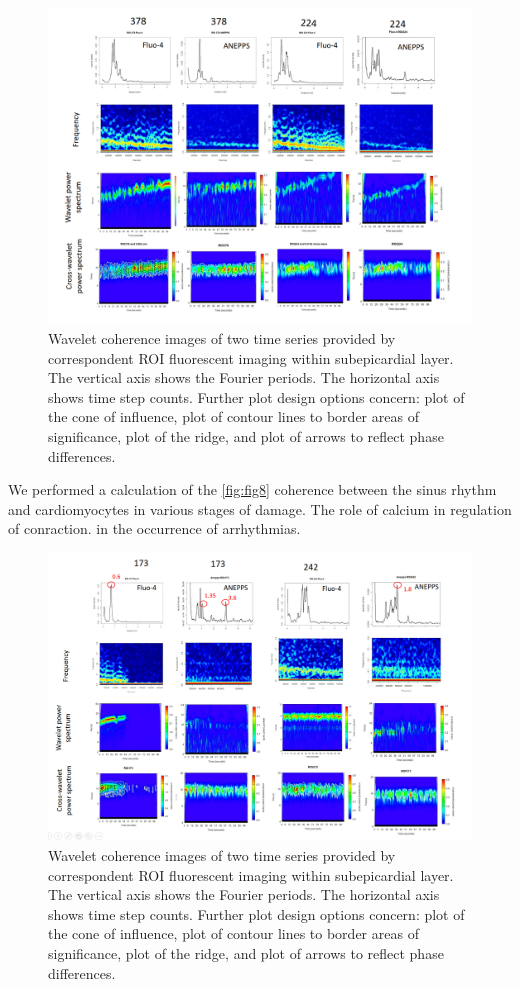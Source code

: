 \documentclass{biophys-new}
\begin{document}
\begin{figure}[hbt!]
\centering
\includegraphics[width=0.8\linewidth]{fig9.png}
\caption{Wavelet coherence images of two time series provided by correspondent ROI fluorescent imaging within subepicardial layer.
The vertical axis shows the Fourier periods. The horizontal axis shows time step counts.
Further plot design options concern: plot of the cone of influence, plot of contour lines to border areas of significance, plot of the ridge, and plot of arrows to reflect phase differences.}
\label{fig:fig9}
\end{figure}


We performed a calculation of the \ref{fig:fig8} coherence between the sinus rhythm and cardiomyocytes in various stages of damage.
The role of calcium in regulation of conraction.
in the occurrence of arrhythmias.

\begin{figure}[hbt!]
\centering
\includegraphics[width=0.8\linewidth]{fig10.png}
\caption{Wavelet coherence images of two time series provided by correspondent ROI fluorescent imaging within subepicardial layer.
The vertical axis shows the Fourier periods. The horizontal axis shows time step counts.
Further plot design options concern: plot of the cone of influence, plot of contour lines to border areas of significance, plot of the ridge, and plot of arrows to reflect phase differences.}
\label{fig:fig10}
\end{figure}
\end{document}
